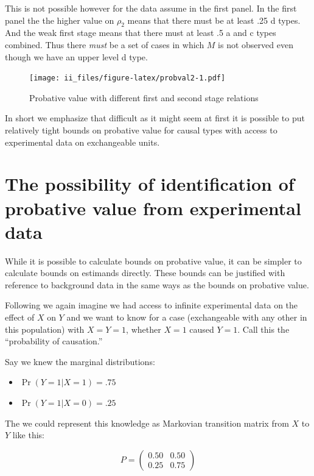 \documentclass[12pt,]{book}
\providecommand{\tightlist}{%
  \setlength{\itemsep}{0pt}\setlength{\parskip}{0pt}}
\begin{document}
This is not possible however for the data assume in the first panel. In the first panel the the higher value on \(\rho_2\) means that there must be at least .25 d types. And the weak first stage means that there must at least .5 a and c types combined. Thus there \emph{must} be a set of cases in which \(M\) is not observed even though we have an upper level d type.

\begin{figure}
\centering
\texttt{[image: ii\_files/figure-latex/probval2-1.pdf]}
\caption{\label{fig:probval2}Probative value with different first and second stage relations}
\end{figure}

In short we emphasize that difficult as it might seem at first it is possible to put relatively tight bounds on probative value for causal types with access to experimental data on exchangeable units.

\hypertarget{the-possibility-of-identification-of-probative-value-from-experimental-data}{%
\section{The possibility of identification of probative value from experimental data}\label{the-possibility-of-identification-of-probative-value-from-experimental-data}}

While it is possible to calculate bounds on probative value, it can be simpler to calculate bounds on estimands directly. These bounds can be justified with reference to background data in the same ways as the bounds on probative value.

Following \citet{dawid2019bounding} we again imagine we had access to infinite experimental data on the effect of \(X\) on \(Y\) and we want to know for a case (exchangeable with any other in this population) with \(X=Y=1\), whether \(X=1\) caused \(Y=1\). Call this the ``probability of causation.''

Say we knew the marginal distributions:

\begin{itemize}
\tightlist
\item
  \(\Pr(Y=1|X=1) = .75\)
\item
  \(\Pr(Y=1|X=0) = .25\)
\end{itemize}

The we could represent this knowledge as Markovian transition matrix from \(X\) to \(Y\) like this:

\[P=\left( \begin{array}{cc} 0.50 & 0.50 \\ 0.25 & 0.75 \end{array}\right)\]
\end{document}
